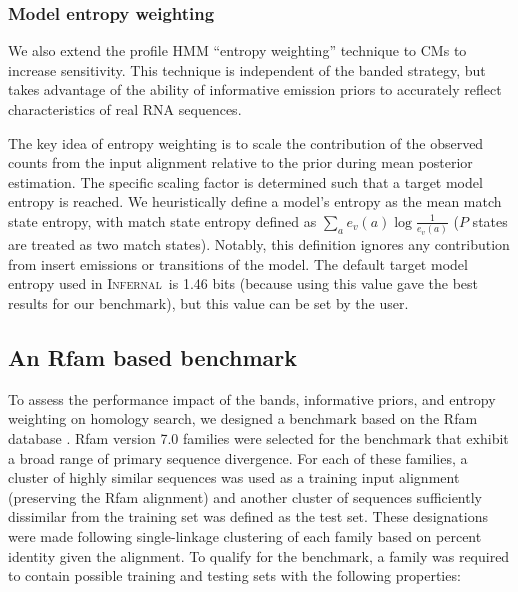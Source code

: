 \documentclass[11pt]{article}
\def\infernal{\textsc{Infernal}~}
\begin{document}
\subsubsection{Model entropy weighting}
We also extend the profile HMM ``entropy weighting'' technique to CMs
to increase sensitivity.
This technique is independent of the banded strategy, but takes
advantage of the ability of informative emission priors to
accurately reflect characteristics of real RNA sequences. 

The key idea of entropy weighting is to scale the contribution of the
observed counts from the input alignment relative to the prior during
mean posterior estimation. The specific scaling factor is
determined such that a target model entropy is reached.
We heuristically define a model's entropy 
as the mean match state entropy, with match state entropy defined as 
$\sum_a e_v(a) \log \frac{1}{e_v(a)}$ ($P$ states are treated as two
match states). Notably, this definition ignores any contribution from
insert emissions or transitions of the model. 
The default target model entropy used in \infernal is 1.46 bits
(because using this value gave the best results for our benchmark), but
this value can be set by the user. 

\subsection{An Rfam based benchmark}

To assess the performance impact of the bands, informative priors, and
entropy weighting on homology search, we designed a 
benchmark based on the Rfam database \cite{Griffiths-Jones05}. Rfam
version 7.0 families were selected for the benchmark that
exhibit a broad range of primary sequence divergence. For each of
these families, a cluster of highly similar sequences was 
used as a training input alignment (preserving the Rfam alignment)
and another cluster of sequences sufficiently dissimilar from the
training set was defined as the test set. 
These designations were made following single-linkage clustering of each
family based on percent identity given the alignment. To qualify for
the benchmark, a family was required to contain possible training and
testing sets with the following properties:
\end{document}

